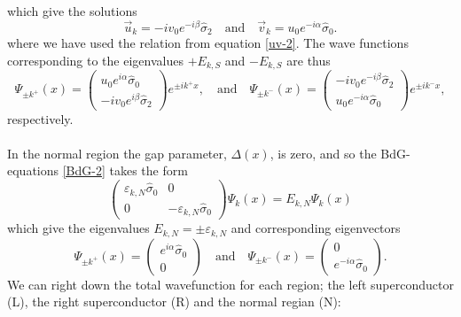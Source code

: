 which give the solutions
\begin{equation}
    \vec{u}_k = -iv_0e^{-i\beta}\hat{\sigma}_2
    \quad \mathrm{and} \quad \vec{v}_k = u_0e^{-i\alpha}\hat{\sigma}_0.
\end{equation}
where we have used the relation from equation \eqref{uv-2}. The wave functions corresponding to the eigenvalues $+E_{k,S}$ and $-E_{k,S}$ are thus
\begin{equation}
\Psi_{\pm   k^{+}}(x) = 
\begin{pmatrix}
u_0e^{i\alpha}\hat{\sigma}_0 \\
-iv_0e^{i\beta}\hat{\sigma}_2
\end{pmatrix}e^{\pm ik^{+}x},
\quad \mathrm{and} \quad
\Psi_{\pm k^{-}}(x) = 
\begin{pmatrix}
-iv_0e^{-i\beta}\hat{\sigma}_2 \\
u_0e^{-i\alpha}\hat{\sigma}_0
\end{pmatrix}e^{\pm ik^{-}x},
\end{equation}
respectively.
\\
\\
In the normal region the gap parameter, $\Delta(x)$, is zero, and so the BdG-equations \eqref{BdG-2} takes the form
\begin{equation}
\begin{pmatrix}
\varepsilon_{k,N}\hat{\sigma}_0 & 0\\
0& -\varepsilon_{k,N}\hat{\sigma}_0
\end{pmatrix}\Psi_k(x)
= E_{k,N}\Psi_k(x)
\end{equation}
which give the eigenvalues $E_{k,N} = \pm \varepsilon_{k,N}$ and corresponding eigenvectors
\begin{equation}
\Psi_{\pm k^+}(x) =
\begin{pmatrix}
e^{i\alpha}\hat{\sigma}_0 \\ 0
\end{pmatrix}
\quad \mathrm{and} \quad
\Psi_{\pm k^-}(x) = 
\begin{pmatrix}
0 \\ e^{-i\alpha}\hat{\sigma}_0
\end{pmatrix}.
\end{equation}
We can right down the total wavefunction for each region; the left superconductor (L), the right superconductor (R) and the normal regian (N):
